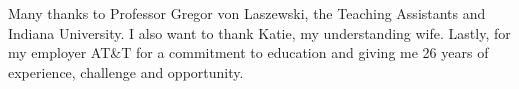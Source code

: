 \documentclass[sigconf]{acmart}
\begin{document}
\begin{acks}

Many thanks to Professor Gregor von Laszewski, the Teaching Assistants and Indiana University.  I also want to thank Katie, my understanding wife.  Lastly, for my employer AT\&T for a commitment to education and giving me 26 years of experience, challenge and opportunity.

\end{acks}




 
\end{document}
